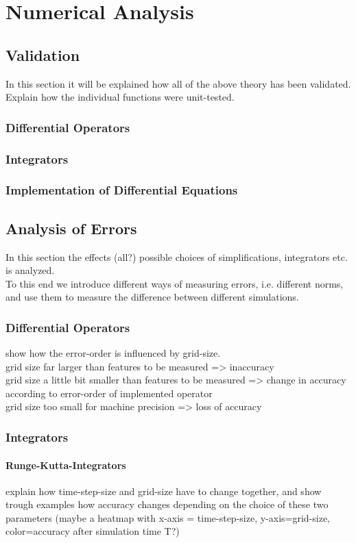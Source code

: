 \chapter{Numerical Analysis}
\section{Validation}
In this section it will be explained how all of the above theory has been validated.
Explain how the individual functions were unit-tested.
\subsection{Differential Operators}
\subsection{Integrators}
\subsection{Implementation of Differential Equations}

\section{Analysis of Errors}\label{chapter:introduction}
In this section the effects (all?) possible choices of simplifications, integrators etc. is analyzed.\\
To this end we introduce different ways of measuring errors, i.e. different norms, and use them to measure the difference between different simulations.

\subsection{Differential Operators}
show how the error-order is influenced by grid-size.\\
grid size far larger than features to be measured => inaccuracy\\
grid size a little bit smaller than features to be measured => change in accuracy according to error-order of implemented operator\\
grid size too small for machine precision => loss of accuracy

\subsection{Integrators}
\subsubsection{Runge-Kutta-Integrators}
explain how time-step-size and grid-size have to change together, and show trough examples how accuracy changes depending on the choice of these two parameters (maybe a heatmap with x-axis = time-step-size, y-axis=grid-size, color=accuracy after simulation time T?)

